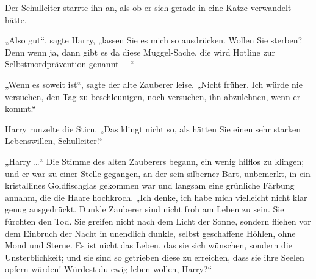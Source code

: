 Der Schulleiter starrte ihn an, als ob er sich gerade in eine Katze verwandelt hätte.

„Also gut“, sagte Harry, „lassen Sie es mich so ausdrücken. Wollen Sie sterben? Denn wenn ja, dann gibt es da diese Muggel-Sache, die wird Hotline zur Selbstmordprävention genannt —“

„Wenn es soweit ist“, sagte der alte Zauberer leise.
„Nicht früher. Ich würde nie versuchen, den Tag zu beschleunigen, noch versuchen, ihn abzulehnen, wenn er kommt.“

Harry runzelte die Stirn.
„Das klingt nicht so, als hätten Sie einen sehr starken Lebenswillen, Schulleiter!“

„Harry …“ Die Stimme des alten Zauberers begann, ein wenig hilflos zu klingen; und er war zu einer Stelle gegangen, an der sein silberner Bart, unbemerkt, in ein kristallines Goldfischglas gekommen war und langsam eine grünliche Färbung annahm, die die Haare hochkroch.
„Ich denke, ich habe mich vielleicht nicht klar genug ausgedrückt. Dunkle Zauberer sind nicht froh am Leben zu sein. Sie fürchten den Tod. Sie greifen nicht nach dem Licht der Sonne, sondern fliehen vor dem Einbruch der Nacht in unendlich dunkle, selbst geschaffene Höhlen, ohne Mond und Sterne. Es ist nicht das Leben, das sie sich wünschen, sondern die Unsterblichkeit; und sie sind so getrieben diese zu erreichen, dass sie ihre Seelen opfern würden! Würdest du ewig leben wollen, Harry?“

